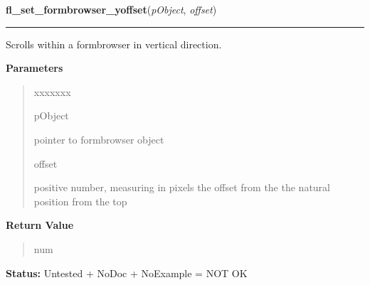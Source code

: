     \vspace{0.5ex}

\hspace{.8\funcindent}\begin{boxedminipage}{\funcwidth}

    \raggedright \textbf{fl\_set\_formbrowser\_yoffset}(\textit{pObject}, \textit{offset})

    \vspace{-1.5ex}

    \rule{\textwidth}{0.5\fboxrule}
\setlength{\parskip}{2ex}
    Scrolls within a formbrowser in vertical direction.

\setlength{\parskip}{1ex}
      \textbf{Parameters}
      \vspace{-1ex}

      \begin{quote}
        \begin{Ventry}{xxxxxxx}

          \item[pObject]

          pointer to formbrowser object

          \item[offset]

          positive number, measuring in pixels the offset from the the 
          natural position from the top

        \end{Ventry}

      \end{quote}

      \textbf{Return Value}
    \vspace{-1ex}

      \begin{quote}
      num

      \end{quote}

\textbf{Status:} Untested + NoDoc + NoExample = NOT OK



    \end{boxedminipage}

    \label{xformslib:library:fl_get_formbrowser_xoffset}

    \vspace{0.5ex}


